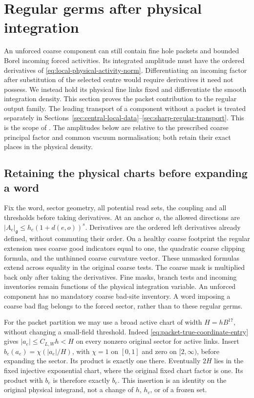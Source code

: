 \documentclass[11pt,reqno]{amsart}
\numberwithin{equation}{section}
\theoremstyle{definition}
\theoremstyle{remark}
\newcommand{\g}{\mathfrak g}
\begin{document}
\section{Regular germs after physical integration}
\label{sec:regular-output-derivatives}

An unforced coarse component can still contain fine hole packets
and bounded Borel incoming forced activities. Its integrated
amplitude must have the ordered derivatives of
\eqref{eq:local-physical-activity-norm}. Differentiating an
incoming factor after substitution of the selected centre would
require derivatives it need not possess. We instead hold its
physical fine links fixed and differentiate the smooth integration
density. This section proves the packet contribution to the
regular output family. The leading transport of a component
without a packet is treated separately in
Sections~\ref{sec:central-local-data}--\ref{sec:sharp-regular-transport}.
This is the scope of \cite[Section~31, pp.~187--194]{Main}.
The amplitudes below are relative to the prescribed coarse
principal factor and common vacuum normalisation; both retain
their exact places in the physical density.

\subsection{Retaining the physical charts before expanding a word}

Fix the word, sector geometry, all potential read sets, the
coupling and all thresholds before taking derivatives. At an
anchor \(o\), the allowed directions are
\(|A_e|_{\g}\le h_c(1+d(e,o))^s\). Derivatives are the ordered
left derivatives already defined, without commuting their order.
On a healthy coarse footprint the regular extension uses coarse
good indicators equal to one, the quadratic coarse clipping
formula, and the unthinned coarse curvature vector. These
unmasked formulas extend across equality in the original coarse
tests. The coarse mask is multiplied back only after taking the
derivatives. Fine masks, branch tests and incoming inventories
remain functions of the physical integration variable.
An unforced component has no mandatory coarse bad-site
inventory. A word imposing a coarse bad flag belongs to the
forced sector, rather than to these regular germs.

For the packet partition we may use a broad active chart of
width \(H=hB^{17}\), without changing a small-field threshold.
Indeed \eqref{eq:packet-true-coordinate-entry} gives
\(|a_e|\le C_{L,W}h<H\) on every nonzero original sector for
active links. Insert \(b_e(a_e)=\chi(|a_e|/H)\), with
\(\chi=1\) on \([0,1]\) and zero on \([2,\infty)\), before
expanding the sector. Its product is exactly one there.
Eventually \(2H\) lies in the fixed injective exponential
chart, where the original fixed chart factor is one. Its
product with \(b_e\) is therefore exactly \(b_e\).
This insertion is an identity on the original physical
integrand, not a change of \(h\), \(h_c\), or of a frozen set.
\end{document}
